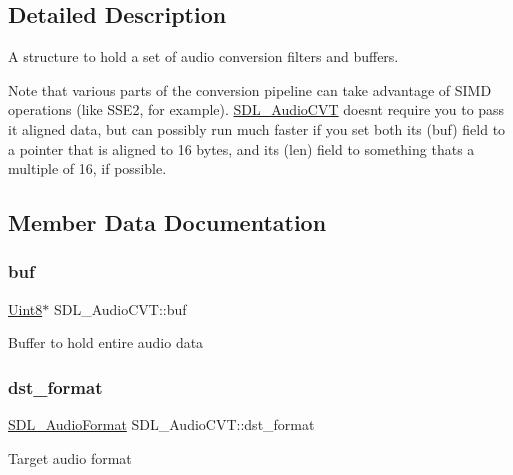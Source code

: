 \subsection{Detailed Description}
A structure to hold a set of audio conversion filters and buffers. 

Note that various parts of the conversion pipeline can take advantage of S\+I\+MD operations (like S\+S\+E2, for example). \mbox{\hyperlink{struct_s_d_l___audio_c_v_t}{S\+D\+L\+\_\+\+Audio\+C\+VT}} doesn\textquotesingle{}t require you to pass it aligned data, but can possibly run much faster if you set both its (buf) field to a pointer that is aligned to 16 bytes, and its (len) field to something that\textquotesingle{}s a multiple of 16, if possible. 

\subsection{Member Data Documentation}
\mbox{\label{struct_s_d_l___audio_c_v_t_a080db27b929efa983c5161360ffce310}} 
\subsubsection{\texorpdfstring{buf}{buf}}
{\footnotesize\ttfamily \mbox{\hyperlink{_s_d_l__stdinc_8h_a2944638813a090aa23e62f4da842c3e2}{Uint8}}$\ast$ S\+D\+L\+\_\+\+Audio\+C\+V\+T\+::buf}

Buffer to hold entire audio data \mbox{\label{struct_s_d_l___audio_c_v_t_a8f890d017be857a3b048bf00525736c6}} 
\subsubsection{\texorpdfstring{dst\+\_\+format}{dst\_format}}
{\footnotesize\ttfamily \mbox{\hyperlink{_s_d_l__audio_8h_a491ed103fd25d920c4e6b7495217ce66}{S\+D\+L\+\_\+\+Audio\+Format}} S\+D\+L\+\_\+\+Audio\+C\+V\+T\+::dst\+\_\+format}

Target audio format \mbox{\label{struct_s_d_l___audio_c_v_t_a35093b3ad3331c17416c593a76012b63}} 

